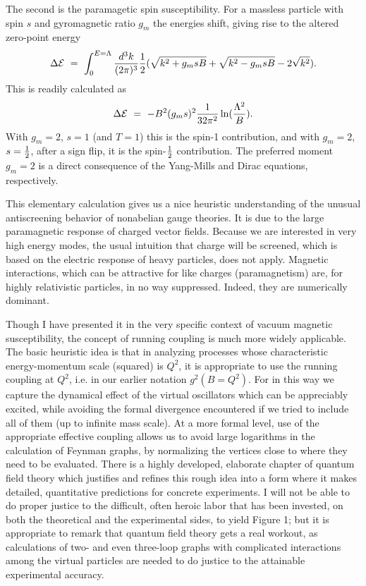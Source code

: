 \documentclass[12pt]{article}
\begin{document}
The second is the paramagetic spin
susceptibility. For a massless particle with spin $s$ and gyromagnetic
ratio $g_m$ the energies shift, giving rise to the altered zero-point
energy
\begin{equation}
\Delta {\cal E} ~=~ \int^{E=\Lambda}_0
{d^3k\over (2\pi)^3} {1\over 2} (\sqrt {k^2 + g_m s B} + \sqrt{k^2 -
g_msB} - 2 \sqrt {k^2}).\label{eq:eshift}
\end{equation}
This is readily
calculated as
\begin{equation}
\Delta {\cal E} ~=~ - B^2 (g_ms)^2
{1\over 32 \pi^2} \ln ({\Lambda^2\over B}).
\label{eq:enum}
\end{equation}
With $g_m = 2$, $s=1$ (and $T=1$) this
is the spin-1 contribution, and with $g_m =2$, $s = {1\over 2}$, after
a sign flip, it is the spin-${1\over 2}$ contribution.  The preferred
moment $g_m = 2$ is a direct consequence of the Yang-Mills and Dirac
equations, respectively. 

This elementary calculation gives us a nice
heuristic understanding of the unusual antiscreening behavior of
nonabelian gauge theories.  It is due to the large paramagnetic
response of charged vector fields.  Because we are interested in very
high energy modes, the usual intuition that charge will be screened,
which is based on the electric response of heavy particles, does not
apply.  Magnetic interactions, which can be attractive for like
charges (paramagnetism) are, for highly relativistic particles, in no
way suppressed.  Indeed, they are numerically dominant.  

Though I
have presented it in the very specific context of vacuum magnetic
susceptibility, the concept of running coupling is much more widely
applicable.  The basic heuristic idea is that in analyzing processes
whose characteristic energy-momentum scale (squared) is $Q^2$, it is
appropriate to use the running coupling at $Q^2$, i.e. in our earlier
notation $g^2(B = Q^2)$.  For in this way we capture the dynamical
effect of the virtual oscillators which can be appreciably excited,
while avoiding the formal divergence encountered if we tried to
include all of them (up to infinite mass scale).  At a more formal
level, use of the appropriate effective coupling allows us to avoid
large logarithms in the calculation of Feynman graphs, by normalizing
the vertices close to where they need to be evaluated.  There is a
highly developed, elaborate chapter of quantum field theory which
justifies and refines this rough idea into a form where it makes
detailed, quantitative predictions for concrete experiments.  I will
not be able to do proper justice to the difficult, often heroic labor
that has been invested, on both the theoretical and the experimental
sides, to yield Figure 1; but it is appropriate to remark that quantum
field theory gets a real workout, as calculations of two- and even
three-loop graphs with complicated interactions among the virtual
particles are needed to do justice to the attainable experimental
accuracy.  
\end{document}

